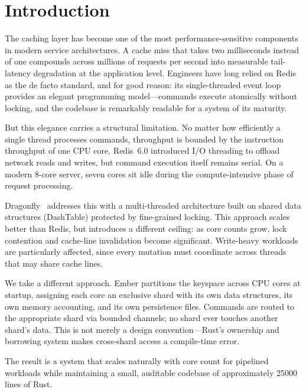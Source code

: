 \documentclass[conference]{IEEEtran}
\begin{document}
\section{Introduction}
\label{sec:intro}

The caching layer has become one of the most performance-sensitive
components in modern service architectures. A cache miss that takes
two milliseconds instead of one compounds across millions of requests
per second into measurable tail-latency degradation at the application
level. Engineers have long relied on Redis~\cite{redis} as the de facto
standard, and for good reason: its single-threaded event loop provides
an elegant programming model---commands execute atomically without
locking, and the codebase is remarkably readable for a system of its
maturity.

But this elegance carries a structural limitation. No matter how
efficiently a single thread processes commands, throughput is bounded
by the instruction throughput of one CPU core. Redis~6.0 introduced
I/O threading to offload network reads and writes, but command
execution itself remains serial. On a modern 8-core server, seven
cores sit idle during the compute-intensive phase of request
processing.

Dragonfly~\cite{dragonfly} addresses this with a multi-threaded
architecture built on shared data structures (DashTable) protected by
fine-grained locking. This approach scales better than Redis, but
introduces a different ceiling: as core counts grow, lock contention
and cache-line invalidation become significant. Write-heavy workloads
are particularly affected, since every mutation must coordinate across
threads that may share cache lines.

We take a different approach. Ember partitions the keyspace across
CPU cores at startup, assigning each core an exclusive shard with its
own data structures, its own memory accounting, and its own persistence
files. Commands are routed to the appropriate shard via bounded
channels; no shard ever touches another shard's data. This is not
merely a design convention---Rust's ownership and borrowing system
makes cross-shard access a compile-time error.

The result is a system that scales naturally with core count for
pipelined workloads while maintaining a small, auditable codebase of
approximately \num{25000} lines of Rust.
\end{document}
